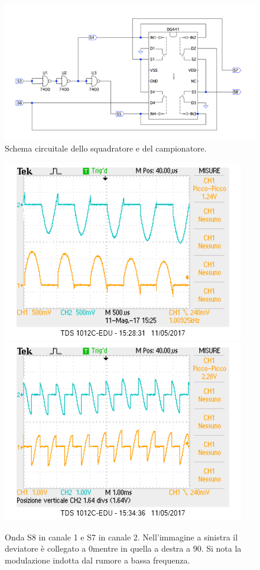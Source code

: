 \documentclass[10pt,a4paper]{article}
\begin{document}
\begin{figure}[!htb]
  \centering
  \includegraphics[scale=0.75]{sqadratore-campionatore.png}
\caption{Schema circuitale dello squadratore e del campionatore.\label{fig:sqadratore-campionatore}}
\end{figure}

\begin{figure}[!htb]
  \centering
  \includegraphics[scale=0.75]{dev0ch1S8-ch2S7.png}\includegraphics[scale=0.75]{dev90ch1S8-ch2S7.png}
\caption{Onda S8 in canale 1 e S7 in canale 2. Nell'immagine a sinistra il deviatore è collegato a 0\degree mentre in quella a destra a 90\degree . Si nota la modulazione indotta dal rumore a bassa frequenza.\label{osc:S7S8}}
\end{figure}
\end{document}
